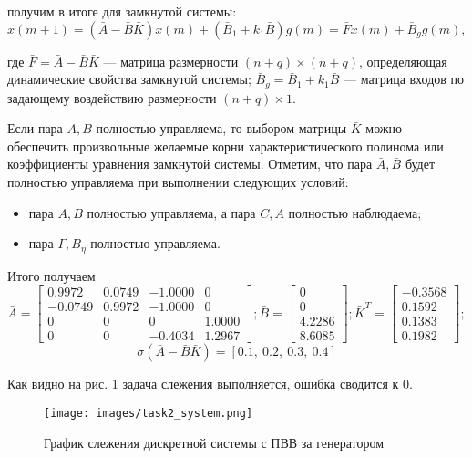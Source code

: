 \documentclass[a4paper, 14pt]{extarticle}
\theoremstyle{definition}
\theoremstyle{plain}
\theoremstyle{remark}
\begin{document}
получим в итоге для замкнутой системы:
\[
\bar{x}(m + 1) = (\bar{A} - \bar{B} \bar{K}) \bar{x}(m) + (\bar{B}_1 + k_1 \bar{B}) g(m) = \bar{F} x(m) + \bar{B}_g g(m),
\]

где \(\bar{F} = \bar{A} - \bar{B} \bar{K}\) — матрица размерности \((n + q) \times (n + q)\), определяющая динамические свойства замкнутой системы; \(\bar{B}_g = \bar{B}_1 + k_1 \bar{B}\) — матрица входов по задающему воздействию размерности \((n + q) \times 1\).

Если пара \(A, B\) полностью управляема, то выбором матрицы \(\bar{K}\) можно обеспечить произвольные желаемые корни характеристического полинома или коэффициенты уравнения замкнутой системы. Отметим, что пара \(\bar{A}, \bar{B}\) будет полностью управляема при выполнении следующих условий:

\begin{itemize}
    \item пара \(A, B\) полностью управляема, а пара \(C, A\) полностью наблюдаема;
    \item пара \(\Gamma, B_\eta\) полностью управляема.
\end{itemize}

Итого получаем
\[
\bar A =
	\begin{bmatrix}
	0.9972 & 0.0749 & -1.0000 & 0 \\
	-0.0749 & 0.9972 & -1.0000 & 0 \\
	0 & 0 & 0 & 1.0000 \\
	0 & 0 & -0.4034 & 1.2967
	\end{bmatrix};
\bar B = \begin{bmatrix}
	0 \\
	0 \\
	4.2286 \\
	8.6085
	\end{bmatrix};
\bar K^T = \begin{bmatrix}
	-0.3568 \\ 0.1592 \\ 0.1383 \\ 0.1982
	\end{bmatrix};
\]
\[\sigma(\bar{A} - \bar{B} \bar{K}) = [0.1,~0.2,~0.3,~0.4]\]

Как видно на рис. \ref{fig:task2_y} задача слежения выполняется, ошибка сводится к 0.
\begin{figure}
	[H]
	\centering
	\texttt{[image: images/task2\_system.png]}
	\caption{График слежения дискретной системы с ПВВ за генератором}
	\label{fig:task2_y}
\end{figure}
\end{document}

